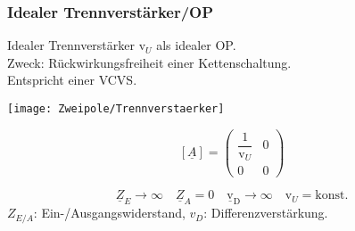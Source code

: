 \subsubsection{Idealer Trennverst\"arker/OP} \label{trennverstärker}
Idealer Trennverstärker  $\text{v}_U$ als idealer OP.\\ 
Zweck: Rückwirkungsfreiheit einer Kettenschaltung.\\
Entspricht einer VCVS.\\
\begin{minipage}{0.5\columnwidth}
\texttt{[image: Zweipole/Trennverstaerker]}
\end{minipage}
\begin{minipage}{0.5\columnwidth}
	\renewcommand*{\arraystretch}{1.7}
	\[
	[\underline{A}] = \begin{pmatrix}
		\dfrac{1}{\text{v}_U} & 0 \\
		0        & 0
	\end{pmatrix}
	\]
\end{minipage}

\begin{equation*}
	\boxed{
	\underline{Z}_E \rightarrow \infty \quad \underline{Z}_A = 0 \quad \underline{\text{v}}_{\text{D}}\rightarrow \infty \quad \text{v}_U = \text{konst.}}
\end{equation*}
{\small
	$Z_{E/A}$: Ein-/Ausgangswiderstand, $v_D$: Differenzverstärkung.
}
